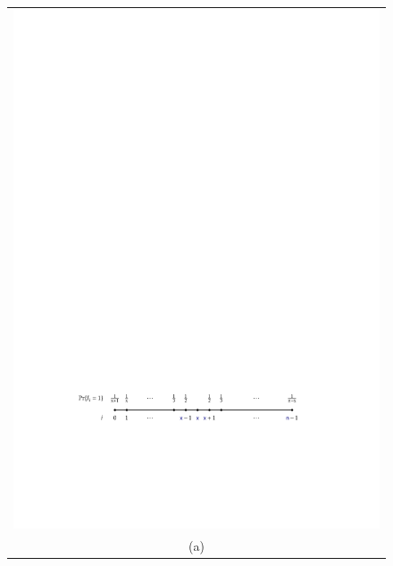 \begin{figure}
  \begin{center}
    \begin{tabular}{@{}c@{}}
      \includegraphics[width=\ScaleIfNeeded]{figs/rbst-probs-a} \\ (a) \\[2ex]

\end{tabular}
\end{center}
\end{figure}
